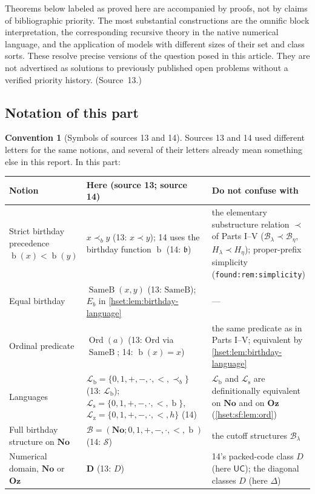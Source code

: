 \documentclass[11pt,letterpaper]{article}
\theoremstyle{definition}
\newtheorem{convention}[convention]{Convention}\aliascntresetthe{convention}
\theoremstyle{remark}
\newcommand{\No}{\mathbf{No}}
\newcommand{\Ord}{\operatorname{Ord}}
\newcommand{\bd}{\operatorname{b}}
\newcommand{\B}{\mathcal B}
\newcommand{\lbl}[1]{\nolinkurl{#1}}
\newcommand{\Oz}{\mathbf{Oz}}
\newcommand{\precb}{\prec_b}
\newcommand{\EqB}{\operatorname{SameB}}
\newcommand{\UC}{\mathsf{UC}}
\newcommand{\Dd}{\mathbf{D}}
\newcommand{\Lb}{\mathcal L_{\mathrm b}}
\newcommand{\Ls}{\mathcal L_{\mathrm s}}
\newcommand{\Lz}{\mathcal L_{\mathrm z}}
\begin{document}
Theorems below labeled as proved here are accompanied by proofs, not by claims of
bibliographic priority. The most substantial constructions are the omnific block
interpretation, the corresponding recursive theory in the native numerical
language, and the application of models with different sizes of their set and
class sorts. These resolve precise versions of the question posed in this
article. They are not advertised as solutions to previously published open
problems without a verified priority history. (Source~13.)

\subsection{Notation of this part}
\label{hset:sf:sub:notation}

\begin{convention}[Symbols of sources 13 and 14]\label{hset:sf:conv:notation}
Sources 13 and 14 used different letters for the same notions, and several of
their letters already mean something else in this report. In this part:
\begin{center}\small
\begin{longtable}{@{}P{0.25\textwidth}P{0.27\textwidth}P{0.40\textwidth}@{}}
\toprule
Notion & Here (source 13; source 14) & Do not confuse with\\
\midrule\endhead
Strict birthday precedence $\bd(x)<\bd(y)$ & $x\precb y$ (13: $x\prec y$); 14
uses the birthday function $\bd$ (14: $\mathfrak b$) & the elementary substructure
relation $\prec$ of Parts I--V ($\B_\lambda\prec\B_\eta$, $H_\lambda\prec H_\eta$);
proper-prefix simplicity (\lbl{found:rem:simplicity})\\
Equal birthday & $\EqB(x,y)$ (13: $\mathrm{SameB}$); $E_b$ in \cref{hset:lem:birthday-language} & ---\\
Ordinal predicate & $\Ord(a)$ (13: $\mathrm{Ord}$ via $\EqB$; 14: $\bd(x)=x$) &
the same predicate as in Parts I--V; equivalent by \cref{hset:lem:birthday-language}\\
Languages & $\Lb=\{0,1,+,-,\cdot,<,\precb\}$ (13: $\mathcal L_{\mathrm b}$);
$\Ls=\{0,1,+,-,\cdot,<,\bd\}$, $\Lz=\{0,1,+,-,\cdot,<,h\}$ (14) & $\Lb$ and $\Ls$
are definitionally equivalent on $\No$ and on $\Oz$ (\cref{hset:sf:lem:ord})\\
Full birthday structure on $\No$ & $\B=(\No;0,1,+,-,\cdot,<,\bd)$ (14: $\mathcal S$) & the cutoff structures $\B_\lambda$\\
Numerical domain, $\No$ or $\Oz$ & $\Dd$ (13: $D$) & 14's packed-code class $D$ (here $\UC$); the diagonal classes $D$ (here $\Delta$)\\

\end{longtable}
\end{center}
\end{convention}
\end{document}
